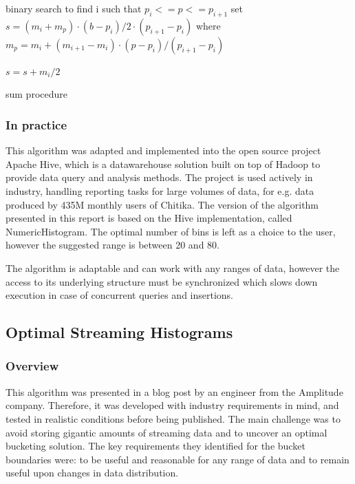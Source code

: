 \documentclass[12pt]{article}
\begin{document}
	\begin{algorithm}
		\label{sum}

		binary search to find i such that $p_i <= p <= p_{i+1}$\;
		set $s = (m_i + m_p) \cdot (b - p_i) / 2 \cdot (p_{i+1} - p_i) $\;
		where $m_p = m_i + (m_{i+1} - m_i) \cdot (p - p_i) / (p_{i+1} - p_i)$\;

		$s = s + m_i / 2$\;
		\caption{sum procedure}
	\end{algorithm}

	\subsubsection{In practice}
	This algorithm was adapted and implemented into the open source project Apache 
	Hive\cite{Thusoo:2009:HWS:1687553.1687609}, which is a datawarehouse solution 
	built on top of Hadoop to provide data query and analysis methods. The project 
	is used actively in industry, handling reporting tasks for large volumes of data,
	for e.g. data produced by 435M monthly users of Chitika\cite{HivePoweredBy}.
	The version of the algorithm presented in this report is based on the Hive 
	implementation, called NumericHistogram\cite{HiveImplementation}. The optimal 
	number of bins is left as a choice to the user, however the suggested range 
	is between 20 and 80.

	The algorithm is adaptable and can work with any ranges of data, however 
	the access to its underlying structure must be synchronized which 
	slows down execution in case of concurrent queries and insertions.

	\subsection{Optimal Streaming Histograms}
	\subsubsection{Overview}
	This algorithm was presented in a blog post\cite{OSHistograms} 
	by an engineer from the Amplitude company. Therefore, it was developed 
	with industry requirements in mind, and tested in realistic conditions 
	before being published. The main challenge was to avoid storing gigantic 
	amounts of streaming data and to uncover an optimal bucketing solution.
	The key requirements they identified for the bucket boundaries were:
	to be useful and reasonable for any range of data and to remain 
	useful upon changes in data distribution.
	
\end{document}
